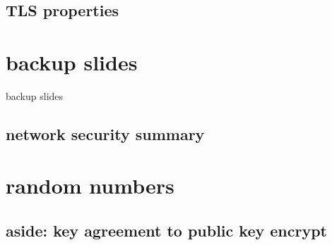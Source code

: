 \subsection{TLS properties}




\usetikzlibrary{circuits.logic.mux}







\section{backup slides}
\begin{frame}{backup slides}
\end{frame}
\subsection{network security summary}


\section{random numbers}

\subsection{aside: key agreement to public key encrypt}





